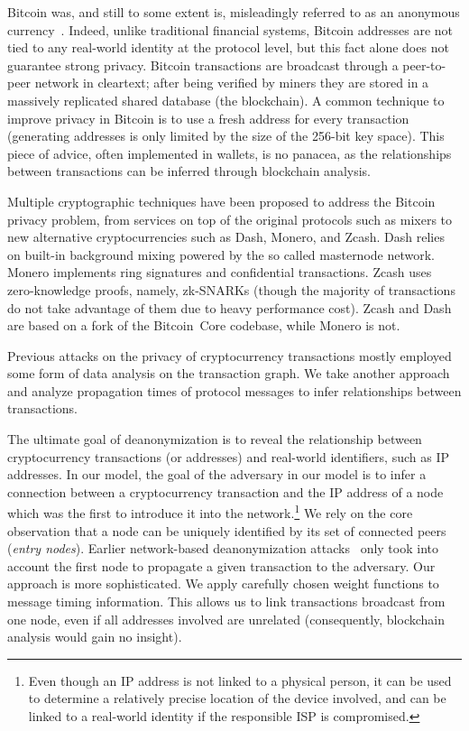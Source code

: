 Bitcoin was, and still to some extent is, misleadingly referred to as an anonymous currency~\cite{Reid2011}.
Indeed, unlike traditional financial systems, Bitcoin addresses are not tied to any real-world identity at the protocol level, but this fact alone does not guarantee strong privacy.
Bitcoin transactions are broadcast through a peer-to-peer network in cleartext; after being verified by miners they are stored in a massively replicated shared database (the blockchain).
A common technique to improve privacy in Bitcoin is to use a fresh address for every transaction (generating addresses is only limited by the size of the 256-bit key space).
This piece of advice, often implemented in wallets, is no panacea, as the relationships between transactions can be inferred through blockchain analysis.

Multiple cryptographic techniques have been proposed to address the Bitcoin privacy problem, from services on top of the original protocols such as mixers to new alternative cryptocurrencies such as Dash, Monero, and Zcash.
Dash relies on built-in background mixing powered by the so called masternode network.
Monero implements ring signatures and confidential transactions.
Zcash uses zero-knowledge proofs, namely, zk-SNARKs (though the majority of transactions do not take advantage of them due to heavy performance cost).
Zcash and Dash are based on a fork of the Bitcoin~Core codebase, while Monero is not.

Previous attacks on the privacy of cryptocurrency transactions mostly employed some form of data analysis on the transaction graph.
We take another approach and analyze propagation times of protocol messages to infer relationships between transactions.

The ultimate goal of deanonymization is to reveal the relationship between cryptocurrency transactions (or addresses) and real-world identifiers, such as IP addresses.
In our model, the goal of the adversary in our model is to infer a connection between a cryptocurrency transaction and the IP address of a node which was the first to introduce it into the network.\footnote{Even though an IP address is not linked to a physical person, it can be used to determine a relatively precise location of the device involved, and can be linked to a real-world identity if the responsible ISP is compromised.}
We rely on the core observation that a node can be uniquely identified by its set of connected peers (\textit{entry nodes}).
Earlier network-based deanonymization attacks~\cite{Biryukov2014, Koshy2014} only took into account the first node to propagate a given transaction to the adversary.
Our approach is more sophisticated.
We apply carefully chosen weight functions to message timing information.
This allows us to link transactions broadcast from one node, even if all addresses involved are unrelated (consequently, blockchain analysis would gain no insight).

